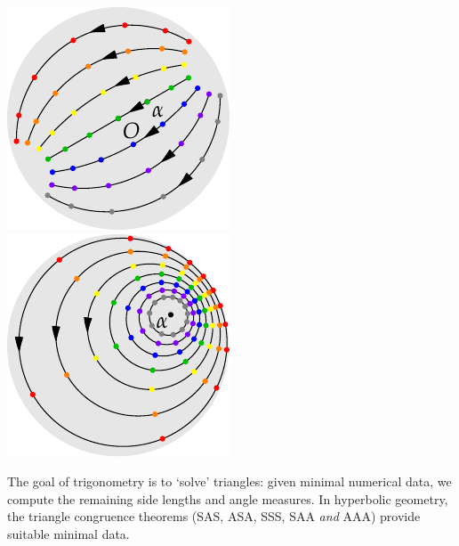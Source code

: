\begin{minipage}[t]{0.24\linewidth}\vspace{-3pt}
\flushright\includegraphics[scale=0.95]{isom-trans}\\
\includegraphics[scale=0.95]{isom-rotate}
\end{minipage}

\goodbreak






The goal of trigonometry is to `solve' triangles: given minimal numerical data, we compute the remaining side lengths and angle measures. In hyperbolic geometry, the triangle congruence theorems (SAS, ASA, SSS, SAA \emph{and} AAA) provide suitable minimal data.\smallbreak

